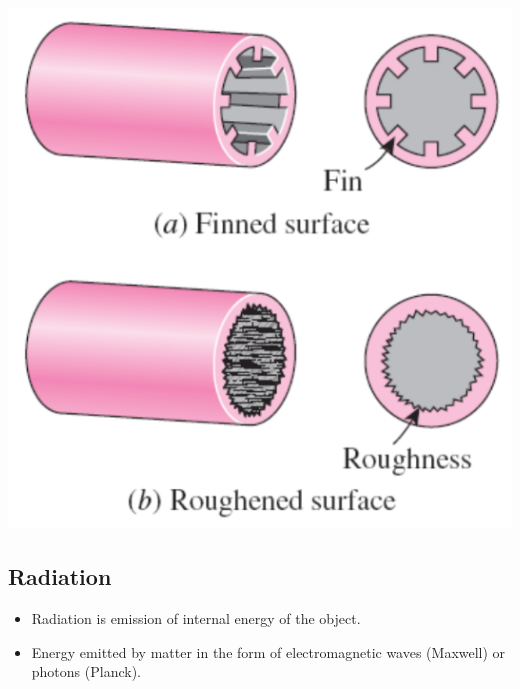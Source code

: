\documentclass[11pt]{article}
\begin{document}
\begin{center}
\includegraphics[width=.9\linewidth]{./images/heat-transfer-enhancement-diagram.png}
\end{center}

\subsection{Radiation}
\label{sec:org18d44a2}
\begin{itemize}
\item Radiation is emission of internal energy of the object.
\item Energy emitted by matter in the form of electromagnetic waves (Maxwell) or photons (Planck).
\end{itemize}
\end{document}
